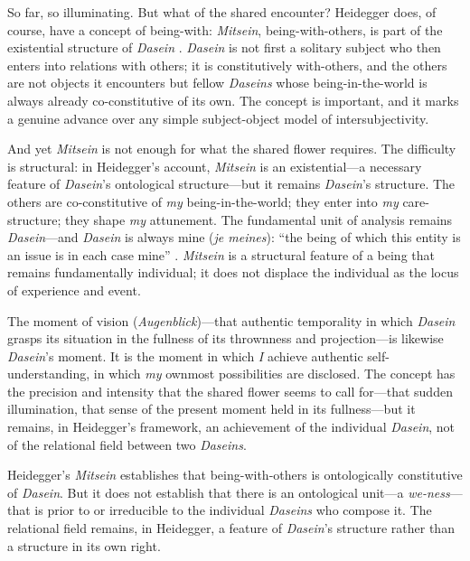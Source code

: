 So far, so illuminating. But what of the shared encounter? Heidegger does, of course, have a concept of being-with: \emph{Mitsein}, being-with-others, is part of the existential structure of \emph{Dasein} \parencite{heidegger1962}. \emph{Dasein} is not first a solitary subject who then enters into relations with others; it is constitutively with-others, and the others are not objects it encounters but fellow \emph{Daseins} whose being-in-the-world is always already co-constitutive of its own. The concept is important, and it marks a genuine advance over any simple subject-object model of intersubjectivity.

And yet \emph{Mitsein} is not enough for what the shared flower requires. The difficulty is structural: in Heidegger's account, \emph{Mitsein} is an existential---a necessary feature of \emph{Dasein}'s ontological structure---but it remains \emph{Dasein}'s structure. The others are co-constitutive of \emph{my} being-in-the-world; they enter into \emph{my} care-structure; they shape \emph{my} attunement. The fundamental unit of analysis remains \emph{Dasein}---and \emph{Dasein} is always mine (\emph{je meines}): ``the being of which this entity is an issue is in each case mine'' \parencite{heidegger1962}. \emph{Mitsein} is a structural feature of a being that remains fundamentally individual; it does not displace the individual as the locus of experience and event.

The moment of vision (\emph{Augenblick})---that authentic temporality in which \emph{Dasein} grasps its situation in the fullness of its thrownness and projection---is likewise \emph{Dasein}'s moment. It is the moment in which \emph{I} achieve authentic self-understanding, in which \emph{my} ownmost possibilities are disclosed. The concept has the precision and intensity that the shared flower seems to call for---that sudden illumination, that sense of the present moment held in its fullness---but it remains, in Heidegger's framework, an achievement of the individual \emph{Dasein}, not of the relational field between two \emph{Daseins}.

\begin{claim}
Heidegger's \emph{Mitsein} establishes that being-with-others is ontologically constitutive of \emph{Dasein}. But it does not establish that there is an ontological unit---a \emph{we-ness}---that is prior to or irreducible to the individual \emph{Daseins} who compose it. The relational field remains, in Heidegger, a feature of \emph{Dasein}'s structure rather than a structure in its own right.
\end{claim}

